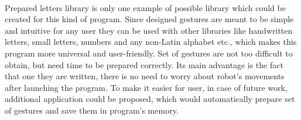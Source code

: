 \mbox{}\\

Prepared letters library is only one example of possible library which could be created for this kind of program. Since designed gestures are meant to be simple and intuitive for any user they can be used with other libraries like handwritten letters, small letters, numbers and any non-Latin alphabet etc., which makes this program more universal and user-friendly. Set of gestures are not too difficult to obtain, but need time to be prepared correctly. Its main advantage is the fact that one they are written, there is no need to worry about robot’s movements after launching the program. To make it easier for user, in case of future work, additional application could be proposed, which would automatically prepare set of gestures and save them in program’s memory. 
